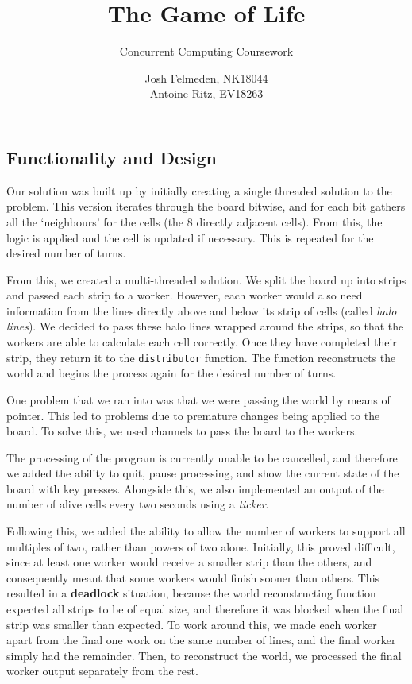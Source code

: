 \documentclass[11pt,a4paper,dvipsnames,cmyk]{scrartcl}
\title{The Game of Life}
\subtitle{Concurrent Computing Coursework}
\author{Josh Felmeden, NK18044 \\ Antoine Ritz, EV18263}
\begin{document}
\maketitle
\begin{multicols}{2}

\section*{Functionality and Design}%
\label{sec:func-and-design}
Our solution was built up by initially creating a single threaded solution
to the problem. This version iterates through the board bitwise, and for
each bit gathers all the `neighbours' for the cells (the 8 directly
adjacent cells). From this, the logic is applied and the cell is updated
if necessary. This is repeated for the desired number of turns.

From this, we created a multi-threaded solution. We split the board up
into strips and passed each strip to a worker. However, each worker would
also need information from the lines directly above and below its strip of
cells (called \textit{halo lines}). We decided to pass these halo lines
wrapped around the strips, so that the workers are able to calculate each
cell correctly. Once they have completed their strip, they return it to
the \texttt{distributor} function. The function reconstructs the world and begins
the process again for the desired number of turns.

One problem that we ran into was that we were passing the world by means
of pointer. This led to problems due to premature changes being applied to
the board. To solve this, we used channels to pass the board to the
workers.

The processing of the program is currently unable to be cancelled, and
therefore we added the ability to quit, pause processing, and show the
current state of the board with key presses. Alongside this, we also
implemented an output of the number of alive cells every two seconds using
a \textit{ticker}. 

Following this, we added the ability to allow the number of workers to
support all multiples of two, rather than powers of two alone. Initially,
this proved difficult, since at least one worker would receive a smaller
strip than the others, and consequently meant that some workers would
finish sooner than others. This resulted in a \textbf{deadlock} situation,
because the world reconstructing function expected all strips to be of
equal size, and therefore it was blocked when the final strip was smaller
than expected. To work around this, we made each worker apart from the
final one work on the same number of lines, and the final worker simply
had the remainder. Then, to reconstruct the world, we processed the final
worker output separately from the rest.


\end{multicols}
\end{document}

